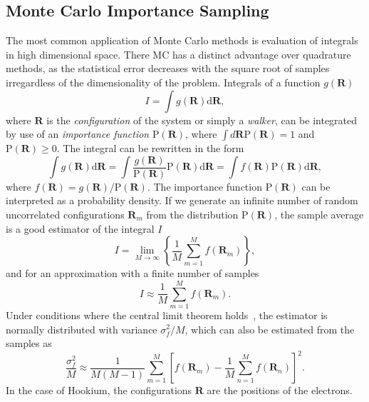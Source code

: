 \documentclass[final,3p,times,twocolumn]{elsarticle}
\begin{document}
	\subsection{Monte Carlo Importance Sampling}
	\label{subsec:Impl-MCIP}
	The most common application of Monte Carlo methods is evaluation of integrals in high dimensional space. There MC has a distinct advantage over quadrature methods, as the statistical error decreases with the square root of samples irregardless of the dimensionality of the problem. Integrals of a function $g(\mathbf{R})$
	\begin{equation}
		I=\int g(\mathbf{R}) \mathrm{d} \mathbf{R},
	\end{equation}
	where $\mathbf{R}$ is the \emph{configuration} of the system or simply a \emph{walker}, can be integrated by use of an \emph{importance function} $\mathrm{P}(\mathbf{R})$, where $\int d \mathbf{R} \text{P}(\mathbf{R})=1$ and $\mathrm{P} (\mathbf{R}) \geq 0$. The integral can be rewritten in the form
	\begin{equation}
		\int g(\mathbf{R}) \mathrm{d} \mathbf{R} = \int \frac{g(\mathbf{R})}{\mathrm{P}(\mathbf{R})} \mathrm{P}(\mathbf{R}) \mathrm{d} \mathbf{R} = \int f(\mathbf{R})\mathrm{P}(\mathbf{R}) \mathrm{d} \mathbf{R},
	\end{equation}
	where $f(\mathbf{R}) = g(\mathbf{R}) / \mathrm{P}(\mathbf{R})$.
	The importance function $\mathrm{P}(\mathbf{R})$ can be interpreted as a probability density. If we generate an infinite number of random uncorrelated configurations $\mathbf{R}_m$ from the distribution $\mathrm{P}(\mathbf{R})$, the sample average is a good estimator of the integral $I$
	\begin{equation}
		I=\lim _{M \rightarrow \infty}\left\{\frac{1}{M} \sum_{m=1}^{M} f\left(\mathbf{R}_{m}\right)\right\},
	\end{equation}
	and for an approximation with a finite number of samples
	\begin{equation}
		I \approx \frac{1}{M} \sum_{m=1}^{M} f\left(\mathbf{R}_{m}\right).
	\end{equation}
	Under conditions where the central limit theorem holds~\cite{foulkes2001quantum}, the estimator is normally distributed with variance $\sigma_{f}^{2}/M$, which can also be estimated from the samples as
	\begin{equation}
		\frac{\sigma_{f}^{2}}{M} \approx \frac{1}{M(M-1)} \sum_{m=1}^{M}\left[f\left(\mathbf{R}_{m}\right)-\frac{1}{M} \sum_{n=1}^{M} f\left(\mathbf{R}_{n}\right)\right]^{2}.
	\end{equation}
	In the case of Hookium, the configurations $\mathbf{R}$ are the positions of the electrons.
	
\end{document}
